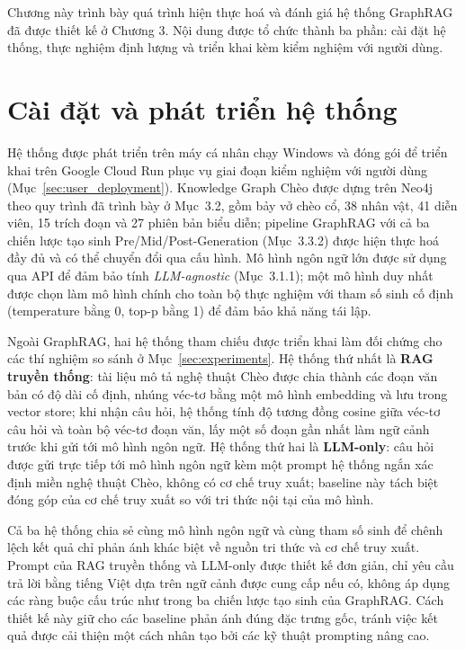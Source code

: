 Chương này trình bày quá trình hiện thực hoá và đánh giá hệ thống GraphRAG đã được thiết kế ở Chương 3. Nội dung được tổ chức thành ba phần: cài đặt hệ thống, thực nghiệm định lượng và triển khai kèm kiểm nghiệm với người dùng.

\section{Cài đặt và phát triển hệ thống}
\label{sec:system_setup}

Hệ thống được phát triển trên máy cá nhân chạy Windows và đóng gói để triển khai trên Google Cloud Run phục vụ giai đoạn kiểm nghiệm với người dùng (Mục~\ref{sec:user_deployment}). Knowledge Graph Chèo được dựng trên Neo4j theo quy trình đã trình bày ở Mục~3.2, gồm bảy vở chèo cổ, 38 nhân vật, 41 diễn viên, 15 trích đoạn và 27 phiên bản biểu diễn; pipeline GraphRAG với cả ba chiến lược tạo sinh Pre/Mid/Post-Generation (Mục~3.3.2) được hiện thực hoá đầy đủ và có thể chuyển đổi qua cấu hình. Mô hình ngôn ngữ lớn được sử dụng qua API để đảm bảo tính \textit{LLM-agnostic} (Mục~3.1.1); một mô hình duy nhất được chọn làm mô hình chính cho toàn bộ thực nghiệm với tham số sinh cố định (temperature bằng 0, top-p bằng 1) để đảm bảo khả năng tái lập.

Ngoài GraphRAG, hai hệ thống tham chiếu được triển khai làm đối chứng cho các thí nghiệm so sánh ở Mục~\ref{sec:experiments}. Hệ thống thứ nhất là \textbf{RAG truyền thống}: tài liệu mô tả nghệ thuật Chèo được chia thành các đoạn văn bản có độ dài cố định, nhúng véc-tơ bằng một mô hình embedding và lưu trong vector store; khi nhận câu hỏi, hệ thống tính độ tương đồng cosine giữa véc-tơ câu hỏi và toàn bộ véc-tơ đoạn văn, lấy một số đoạn gần nhất làm ngữ cảnh trước khi gửi tới mô hình ngôn ngữ. Hệ thống thứ hai là \textbf{LLM-only}: câu hỏi được gửi trực tiếp tới mô hình ngôn ngữ kèm một prompt hệ thống ngắn xác định miền nghệ thuật Chèo, không có cơ chế truy xuất; baseline này tách biệt đóng góp của cơ chế truy xuất so với tri thức nội tại của mô hình.

Cả ba hệ thống chia sẻ cùng mô hình ngôn ngữ và cùng tham số sinh để chênh lệch kết quả chỉ phản ánh khác biệt về nguồn tri thức và cơ chế truy xuất. Prompt của RAG truyền thống và LLM-only được thiết kế đơn giản, chỉ yêu cầu trả lời bằng tiếng Việt dựa trên ngữ cảnh được cung cấp nếu có, không áp dụng các ràng buộc cấu trúc như trong ba chiến lược tạo sinh của GraphRAG. Cách thiết kế này giữ cho các baseline phản ánh đúng đặc trưng gốc, tránh việc kết quả được cải thiện một cách nhân tạo bởi các kỹ thuật prompting nâng cao.

